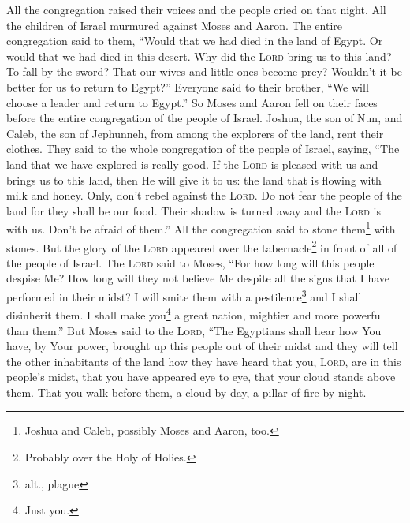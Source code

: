
\begin{inparaenum}
     All the congregation raised their voices and the people cried on that night.%
     All the children of Israel murmured against Moses and Aaron. The entire congregation said to them, ``Would that we had died in the land of Egypt. Or would that we had died in this desert.%
     Why did the \textsc{Lord} bring us to this land? To fall by the sword? That our wives and little ones become prey? Wouldn't it be better for us to return to Egypt?''%
     Everyone said to their brother, ``We will choose a leader and return to Egypt.''%
     So Moses and Aaron fell on their faces before the entire congregation of the people of Israel.%
     Joshua, the son of Nun, and Caleb, the son of Jephunneh, from among the explorers of the land, rent their clothes.%
     They said to the whole congregation of the people of Israel, saying, ``The land that we have explored is really good.%
     If the \textsc{Lord} is pleased with us and brings us to this land, then He will give it to us: the land that is flowing with milk and honey.%
     Only, don't rebel against the \textsc{Lord}. Do not fear the people of the land for they shall be our food. Their shadow is turned away and the \textsc{Lord} is with us. Don't be afraid of them.''%
     All the congregation said to stone them\footnote{Joshua and Caleb, possibly Moses and Aaron, too.} with stones. But the glory of the \textsc{Lord} appeared over the tabernacle\footnote{Probably over the Holy of Holies.} in front of all of the people of Israel.%
     The \textsc{Lord} said to Moses, ``For how long will this people despise Me? How long will they not believe Me despite all the signs that I have performed in their midst?%
     I will smite them with a pestilence\footnote{alt., plague} and I shall disinherit them. I shall make you\footnote{Just you.} a great nation, mightier and more powerful than them.''%
     But Moses said to the \textsc{Lord}, ``The Egyptians shall hear how You have, by Your power, brought up this people out of their midst%
     and they will tell the other inhabitants of the land how they have heard that you, \textsc{Lord}, are in this people's midst, that you have appeared eye to eye, that your cloud stands above them. That you walk before them, a cloud by day, a pillar of fire by night.%

\end{inparaenum}
